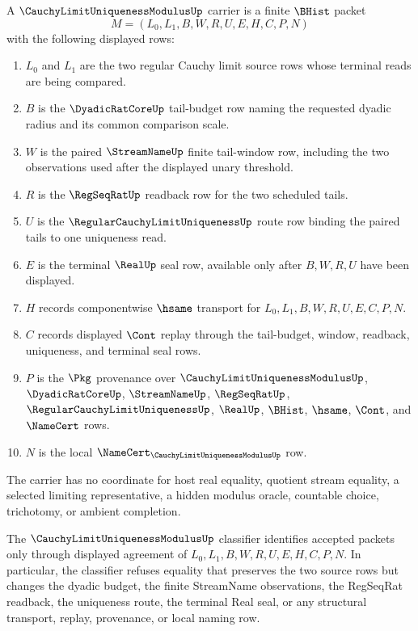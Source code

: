 \begin{definition}
\label{def:cauchy-limit-uniqueness-modulus-carrier}
A $\CauchyLimitUniquenessModulusUp$ carrier is a finite $\BHist$ packet
$$
M=(L_0,L_1,B,W,R,U,E,H,C,P,N)
$$
with the following displayed rows:
\begin{enumerate}
\item $L_0$ and $L_1$ are the two regular Cauchy limit source rows whose terminal reads are being compared.
\item $B$ is the $\DyadicRatCoreUp$ tail-budget row naming the requested dyadic radius and its common comparison scale.
\item $W$ is the paired $\StreamNameUp$ finite tail-window row, including the two observations used after the displayed unary threshold.
\item $R$ is the $\RegSeqRatUp$ readback row for the two scheduled tails.
\item $U$ is the $\RegularCauchyLimitUniquenessUp$ route row binding the paired tails to one uniqueness read.
\item $E$ is the terminal $\RealUp$ seal row, available only after $B,W,R,U$ have been displayed.
\item $H$ records componentwise $\hsame$ transport for $L_0,L_1,B,W,R,U,E,C,P,N$.
\item $C$ records displayed $\Cont$ replay through the tail-budget, window, readback, uniqueness, and terminal seal rows.
\item $P$ is the $\Pkg$ provenance over $\CauchyLimitUniquenessModulusUp$, $\DyadicRatCoreUp$, $\StreamNameUp$, $\RegSeqRatUp$, $\RegularCauchyLimitUniquenessUp$, $\RealUp$, $\BHist$, $\hsame$, $\Cont$, and $\NameCert$ rows.
\item $N$ is the local $\NameCert_{\CauchyLimitUniquenessModulusUp}$ row.
\end{enumerate}
The carrier has no coordinate for host real equality, quotient stream equality, a selected limiting representative, a hidden modulus oracle, countable choice, trichotomy, or ambient completion.
\end{definition}

\begin{definition}
\label{def:cauchy-limit-uniqueness-modulus-classifier}
The $\CauchyLimitUniquenessModulusUp$ classifier identifies accepted packets only through displayed agreement of $L_0,L_1,B,W,R,U,E,H,C,P,N$. In particular, the classifier refuses equality that preserves the two source rows but changes the dyadic budget, the finite StreamName observations, the RegSeqRat readback, the uniqueness route, the terminal Real seal, or any structural transport, replay, provenance, or local naming row.
\end{definition}

